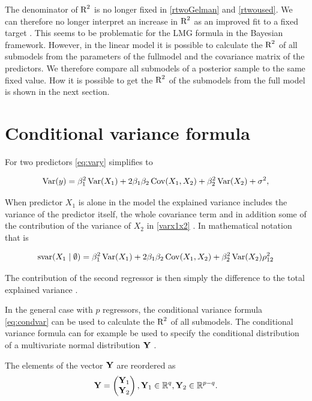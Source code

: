 \documentclass[11pt,a4paper,twoside]{book}\usepackage[]{graphicx}\usepackage[]{color}
\begin{document}
 The denominator of $\text{R}^2$ is no longer fixed in \eqref{rtwoGelman} and \eqref{rtwoused}. We can therefore no longer interpret an increase in $\text{R}^2$ as an improved fit to a fixed target \citep{Gelman2017}. This seems to be problematic for the LMG formula in the Bayesian framework. However, in the linear model it is possible to calculate the $\text{R}^2$ of all submodels from the parameters of the fullmodel and the covariance matrix of the predictors. We therefore compare all submodels of a posterior sample to the same fixed value. How it is possible to get the $\text{R}^2$ of the submodels from the full model is shown in the next section.

\section{Conditional variance formula}


For two predictors \eqref{eq:vary} simplifies to

      \begin{align} 
        \operatorname{Var}(y) = \beta_{1}^2 \operatorname{Var}(X_{1}) + 2  \beta_{1}  \beta_{2} \operatorname{Cov}(X_{1}, X_{2}) + \beta_{2}^2 \operatorname{Var}(X_{2}) + \sigma^2, \label{varx1x2} 
   \end{align}
 
 When predictor $X_{1}$ is alone in the model the explained variance includes the variance of the predictor itself, the whole covariance term and in addition some of the contribution of the variance of $X_{2}$ in \eqref{varx1x2} . In mathematical notation that is
 
      \begin{align} 
        \text{svar}({X_{1}} \mid \emptyset ) = \beta_{1}^2 \operatorname{Var}(X_{1}) + 2  \beta_{1}  \beta_{2} \operatorname{Cov}(X_{1}, X_{2}) + \beta_{2}^2 \operatorname{Var}(X_{2}) \rho_{12}^2 \nonumber 
   \end{align}
   
The contribution of the second regressor is then simply the difference to the total explained variance \citep{Gromping2007}. 

In the general case with $p$ regressors, the conditional variance formula \eqref{eq:condvar} can be used to calculate the $\text{R}^2$ of all submodels. The conditional variance formula can for example be used to specify the conditional distribution of a multivariate normal distribution ${\mathbf{Y}}$ .

The elements of the vector ${\mathbf{Y}}$ are reordered as
\begin{align*}
\mathbf{Y} = \begin{pmatrix}
\mathbf{Y}_{1} \\ 
\mathbf{Y}_{2} \end{pmatrix}, \mathbf{Y}_{1} \in {\mathbb{R}}^q, \mathbf{Y}_{2} \in {\mathbb{R}}^{p-q} .
\end{align*}
\end{document}

